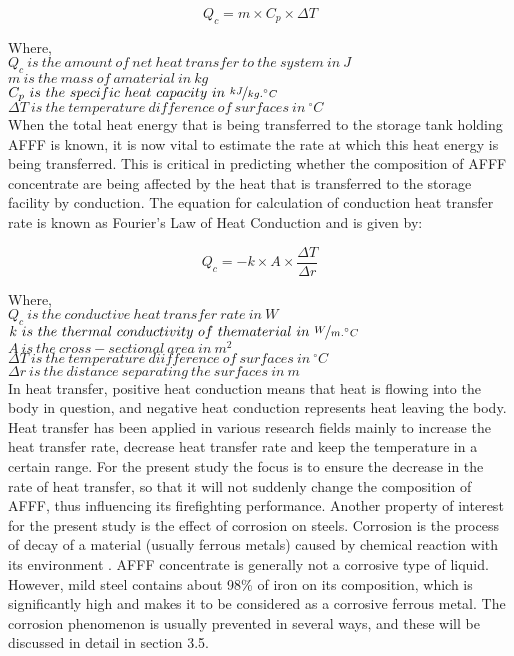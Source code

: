 \begin{equation}
    Q_c = m \times C_p \times \Delta T
\end{equation}

\noindent Where, \\
$Q_c\ is\ the\ amount\ of\ net\ heat\ transfer\ to\ the\ system\ in\ J$ \\
$m\ is\ the\ mass\ of\ amaterial\ in\ kg$ \\
$C_p\ is\ the\ specific\ heat\ capacity\ in\ \nicefrac{kJ}{kg.^\circ C}$ \\
$\Delta T\ is\ the\ temperature\ difference\ of\ surfaces\ in\ ^\circ C$ \\

When the total heat energy that is being transferred to the storage tank holding AFFF is known, it is now vital to estimate the rate at which this heat energy is being transferred. This is critical in predicting whether the composition of AFFF concentrate are being affected by the heat that is transferred to the storage facility by conduction. The equation for calculation of conduction heat transfer rate is known as Fourier’s Law of Heat Conduction and is given by:

\begin{equation}
    Q_c = -k \times A \times \frac{\Delta T}{\Delta r}
\end{equation}

\noindent Where, \\
$Q_c\ is\ the\ conductive\ heat\ transfer\ rate\ in\ W$ \\
$k\ is\ the\ thermal\ conductivity\ of\ thematerial\ in\ \nicefrac{W}{m.^\circ C}$ \\
$A\ is\ the\ cross-sectional\ area\ in\ m^2$ \\
$\Delta T\ is\ the\ temperature\ diifference\ of\ surfaces\ in\ ^\circ C$ \\
$\Delta r\ is\ the\ distance\ separating\ the\ surfaces\ in\ m$ \\

In heat transfer, positive heat conduction means that heat is flowing into the body in question, and negative heat conduction represents heat leaving the body. Heat transfer has been applied in various research fields mainly to increase the heat transfer rate, decrease heat transfer rate and keep the temperature in a certain range. For the present study the focus is to ensure the decrease in the rate of heat transfer, so that it will not suddenly change the composition of AFFF, thus influencing its firefighting performance.  
Another property of interest for the present study is the effect of corrosion on steels. Corrosion is the process of decay of a material (usually ferrous metals) caused by chemical reaction with its environment \cite{islam2018effects}. AFFF concentrate is generally not a corrosive type of liquid. However, mild steel contains about 98\% of iron on its composition, which is significantly high and makes it to be considered as a corrosive ferrous metal.  The corrosion phenomenon is usually prevented in several ways, and these will be discussed in detail in section 3.5.

